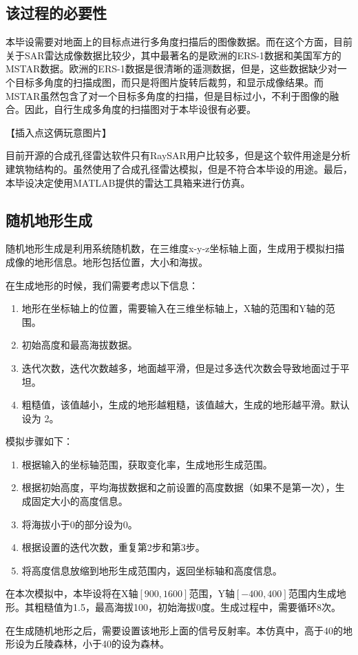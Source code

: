 \documentclass{xduugthesis}
\begin{document}
\subsection{该过程的必要性}
本毕设需要对地面上的目标点进行多角度扫描后的图像数据。而在这个方面，目前关于SAR雷达成像数据比较少，其中最著名的是欧洲的ERS-1数据\cite{ERS}和美国军方的MSTAR数据\cite{MSTAR}。欧洲的ERS-1数据是很清晰的遥测数据，但是，这些数据缺少对一个目标多角度的扫描成图，而只是将图片旋转后裁剪，和显示成像结果。而MSTAR虽然包含了对一个目标多角度的扫描，但是目标过小，不利于图像的融合。因此，自行生成多角度的扫描图对于本毕设很有必要。\par
【插入点这俩玩意图片】\par
目前开源的合成孔径雷达软件只有RaySAR\cite{RaySAR}用户比较多，但是这个软件用途是分析建筑物结构的。虽然使用了合成孔径雷达模拟，但是不符合本毕设的用途。最后，本毕设决定使用MATLAB提供的雷达工具箱来进行仿真。
\subsection{随机地形生成}
随机地形生成是利用系统随机数，在三维度x-y-z坐标轴上面，生成用于模拟扫描成像的地形信息。地形包括位置，大小和海拔。\par
在生成地形的时候，我们需要考虑以下信息：
\begin{enumerate}
	\item 地形在坐标轴上的位置，需要输入在三维坐标轴上，X轴的范围和Y轴的范围。
	\item 初始高度和最高海拔数据。
	\item 迭代次数，迭代次数越多，地面越平滑，但是过多迭代次数会导致地面过于平坦。
	\item 粗糙值，该值越小，生成的地形越粗糙，该值越大，生成的地形越平滑。默认设为 2。
\end{enumerate}
模拟步骤如下：
\begin{enumerate}
	\item 根据输入的坐标轴范围，获取变化率，生成地形生成范围。
	\item 根据初始高度，平均海拔数据和之前设置的高度数据（如果不是第一次），生成固定大小的高度信息。
	\item 将海拔小于0的部分设为0。
	\item 根据设置的迭代次数，重复第2步和第3步。
	\item 将高度信息放缩到地形生成范围内，返回坐标轴和高度信息。
\end{enumerate}\par
在本次模拟中，本毕设将在X轴$[900, 1600]$范围，Y轴$[-400, 400]$范围内生成地形。其粗糙值为1.5，最高海拔100，初始海拔0度。生成过程中，需要循环8次。\par
在生成随机地形之后，需要设置该地形上面的信号反射率。本仿真中，高于40的地形设为丘陵森林，小于40的设为森林。
\end{document}
